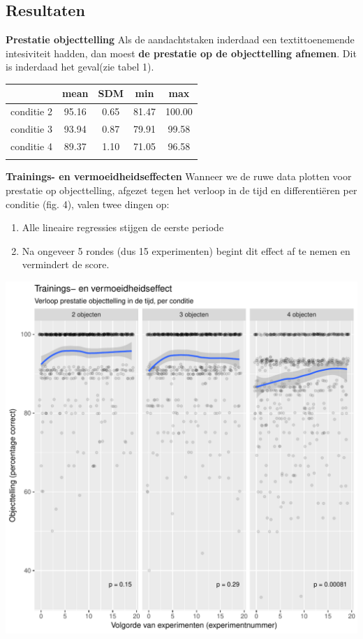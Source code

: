 \documentclass[a0,portrait]{a0poster}
\begin{document}
\begin{multicols}{3}
\section*{Resultaten}
\textbf{Prestatie objecttelling} Als de aandachtstaken inderdaad een textit{toenemende intesiviteit} hadden, dan moest \textbf{de prestatie op de objecttelling afnemen}. Dit is inderdaad het geval(zie tabel 1).
\begin{center}
\begin{tabular}{c c c c c}
	 &  mean  & SDM & min & max\\
	\hline
	conditie 2 & 95.16 & 0.65 & 81.47 & 100.00\\
	conditie 3 & 93.94 & 0.87 & 79.91 & 99.58\\
	conditie 4 & 89.37 & 1.10 & 71.05 & 96.58\\
	\hline\\
\end{tabular}
\end{center}
\textbf{Trainings- en vermoeidheidseffecten} Wanneer we de ruwe data plotten voor prestatie op objecttelling, afgezet tegen het verloop in de tijd en differenti\"eren per conditie (fig. 4), valen twee dingen op:
\begin{enumerate}
	\item Alle lineaire regressies stijgen de eerste periode
	\item Na ongeveer 5 rondes (dus 15 experimenten) begint dit effect af te nemen en vermindert de score.
\end{enumerate}
 \begin{center}\vspace{1cm}
	\includegraphics[width=0.8\linewidth]{training-grid.pdf}

\end{center}
\end{multicols}
\end{document}
